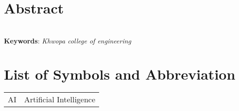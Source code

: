 		
		
		\large
			\chapter*{Abstract}
		\normalsize
        \noindent
        \lipsum[10]\\
        \textbf{Keywords}: 
		\textit{Khwopa college of engineering
 }\\

		\break


	    \tableofcontents

		\listoftables
		\break
		\pagebreak

		\listoffigures
		\break
	
	
	
		\Large
			\begingroup
				\let\clearpage\relax
				\chapter*{List of Symbols and Abbreviation}
			\endgroup
   
		\normalsize
		\begin{tabular}{p{1in}p{5in}} 
                AI & Artificial Intelligence\\
                
            \end{tabular}





		\break
		\pagebreak
		
	